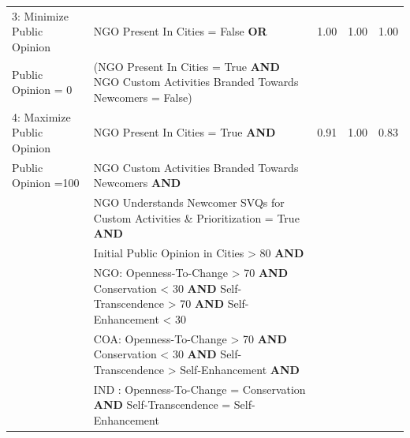 \documentclass{scspaperproc}
\theoremstyle{scsthe}
\begin{document}
\begin{table}[ht]
\begin{center}
{\begin{tabular}{|l l l l l |}
 \hline
3: Minimize Public Opinion                                                                                       &     NGO Present In Cities  = False  \textbf{OR}   & 1.00 & 1.00 & 1.00   \\
\hspace*{0.25 cm} Public Opinion = 0 & (NGO Present In Cities  = True \textbf{AND} NGO Custom Activities Branded Towards Newcomers = False) & & & \\
\hline
4: Maximize Public Opinion                                                                                       &     NGO Present In Cities  = True  \textbf{AND}   & 0.91 & 1.00 & 0.83   \\
\hspace*{0.25cm} Public Opinion =100 & NGO Custom Activities Branded Towards Newcomers \textbf{AND} & & & \\
                                                                      & NGO Understands Newcomer SVQs for Custom Activities \& Prioritization = True \textbf{AND} & &  & \\
                                                                      & Initial Public Opinion in Cities > 80 \textbf{AND} & & & \\  
                                                                      & NGO: Openness-To-Change > 70 \textbf{AND} Conservation < 30 \textbf{AND} Self-Transcendence > 70 \textbf{AND} Self-Enhancement < 30& & & \\         
                                                                      & COA: Openness-To-Change > 70 \textbf{AND} Conservation < 30 \textbf{AND} Self-Transcendence > Self-Enhancement \textbf{AND} & & & \\         
                                                                      & IND : Openness-To-Change = Conservation \textbf{AND} Self-Transcendence = Self-Enhancement & & & \\         
\hline
\end{tabular}}
\end{center}
\end{table}
 
\end{document}
